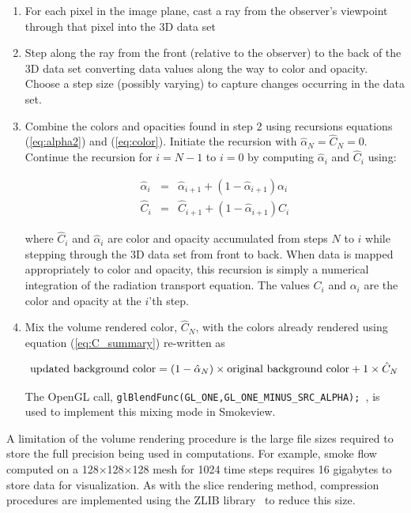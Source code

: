{\begin{enumerate}

\item For each pixel in the image plane, cast a ray from the observer's viewpoint through that pixel into the 3D data set

\item Step along the ray from the front (relative to the observer) to the back of the 3D data set converting data values along the way to color and opacity.  Choose a step size (possibly varying) to capture changes occurring in the data set.

\item
Combine the colors and opacities found in step 2 using recursions equations (\ref{eq:alpha2}) and (\ref{eq:color}).
Initiate the recursion with $\hat{\alpha}_{N}=\hat{C}_{N}=0$. Continue the recursion for $i=N-1$ to $i=0$ by computing $\hat{\alpha}_i$ and $\hat{C}_i$ using:

\begin{eqnarray}
\hat{\alpha}_i&=&\hat{\alpha}_{i+1}+\left(1-\hat{\alpha}_{i+1}\right)\alpha_i\\
\hat{C}_i&=&\hat{C}_{i+1}+\left(1-\hat{\alpha}_{i+1}\right)C_i
\end{eqnarray}

where $\hat{C}_i$ and $\hat{\alpha}_i$ are color and opacity accumulated from steps $N$ to $i$ while stepping through the 3D data set from front to back.  When data is mapped appropriately to color and opacity, this recursion is simply a numerical integration of the radiation transport equation.
The values $C_i$ and $\alpha_i$ are the color and opacity at the $i$'th step.

\item Mix the volume rendered color, $\hat{C}_N$, with the colors already rendered using equation (\ref{eq:C_summary}) re-written as

\begin{eqnarray}
\noindent\mbox{updated background color} = (1-\hat{\alpha}_N)\times \mbox{original background color} + 1\times\hat{C}_N
\end{eqnarray}

The OpenGL call, {\tt   glBlendFunc(GL\_ONE,GL\_ONE\_MINUS\_SRC\_ALPHA); }, is used to implement this mixing mode in Smokeview.
\end{enumerate}

A limitation of the volume rendering procedure is the large file sizes required to store the full precision being used in computations.  For example, smoke flow computed on a 128$\times$128$\times$128 mesh for 1024 time steps requires 16 gigabytes to store data for visualization.  As with the slice rendering method, compression procedures are implemented using the ZLIB library~\cite{ZLIB} to reduce this size.


}
